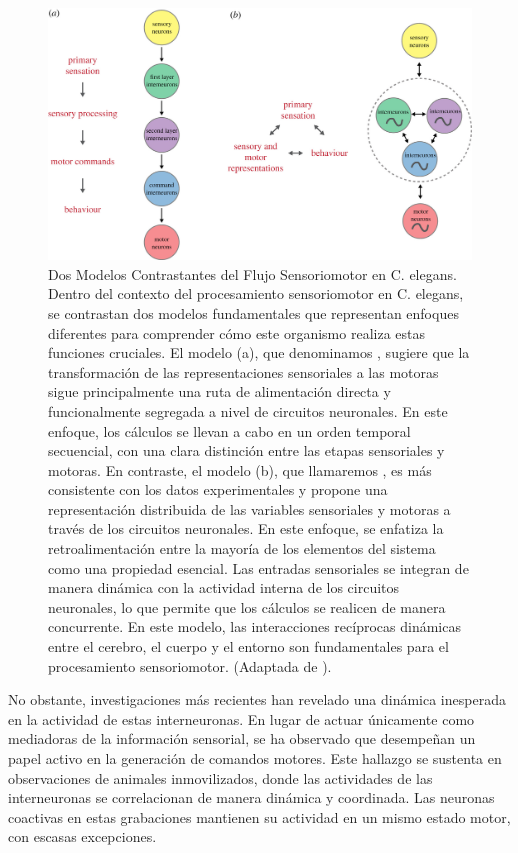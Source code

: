 \begin{figure}[h!]
	\centering\includegraphics[width=\imsize]{sensioral.jpg}
	\caption[ Dos Modelos Contrastantes del Flujo Sensoriomotor en C. elegans.]{ Dos Modelos Contrastantes del Flujo Sensoriomotor en C. elegans. Dentro del contexto del procesamiento sensoriomotor en C. elegans, se contrastan dos modelos fundamentales  que representan enfoques diferentes para comprender cómo este organismo realiza estas funciones cruciales. El modelo (a), que denominamos , sugiere que la transformación de las representaciones sensoriales a las motoras sigue principalmente una ruta de alimentación directa y funcionalmente segregada a nivel de circuitos neuronales. En este enfoque, los cálculos se llevan a cabo en un orden temporal secuencial, con una clara distinción entre las etapas sensoriales y motoras. En contraste, el modelo (b), que llamaremos , es más consistente con los datos experimentales y propone una representación distribuida de las variables sensoriales y motoras a través de los circuitos neuronales. En este enfoque, se enfatiza la retroalimentación entre la mayoría de los elementos del sistema como una propiedad esencial. Las entradas sensoriales se integran de manera dinámica con la actividad interna de los circuitos neuronales, lo que permite que los cálculos se realicen de manera concurrente. En este modelo, las interacciones recíprocas dinámicas entre el cerebro, el cuerpo y el entorno son fundamentales para el procesamiento sensoriomotor.	  (Adaptada de \protect\cite{kaplan_sensorimotor_2018} ).}\label{fig:computosistema}
\end{figure}


No obstante, investigaciones más recientes han revelado una dinámica inesperada en la actividad de estas interneuronas. En lugar de actuar únicamente como mediadoras de la información sensorial, se ha observado que desempeñan un papel activo en la generación de comandos motores. Este hallazgo se sustenta en observaciones de animales inmovilizados, donde las actividades de las interneuronas se correlacionan de manera dinámica y coordinada. Las neuronas coactivas en estas grabaciones mantienen su actividad en un mismo estado motor, con escasas excepciones.

